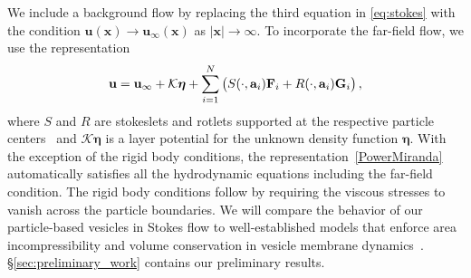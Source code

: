 We include a background flow by replacing the third equation in
\eqref{eq:stokes} with the condition $\mathbf{u}(\mathbf{x})
\to \mathbf{u}_{\infty}(\mathbf{x})$ as $|\mathbf{x}| \to
\infty$. To incorporate the far-field flow, we use the representation 
\begin{align}
\label{PowerMiranda}
  {\bf u} = {\bf u}_{\infty} + \mathcal{K}\boldsymbol{\eta} + 
    \sum_{i=1}^N \left(S(\cdot, {\bf a}_i) {\bf F}_i + 
                 R(\cdot, {\bf a}_i) {\bf G}_i\right),
\end{align}
where $S$ and $R$ are stokeslets and rotlets supported at the respective
particle centers~\cite{leal_2007} and $\mathcal{K}\boldsymbol{\eta}$ is a layer
potential for the unknown density function $\boldsymbol{\eta}$. With the
exception of the rigid body conditions, the
representation~\eqref{PowerMiranda} automatically satisfies all the
hydrodynamic equations including the far-field condition. The rigid
body conditions follow by requiring the viscous stresses to vanish across
the particle boundaries.
%
We will compare the behavior of our particle-based vesicles in Stokes
flow to well-established models that enforce area incompressibility and
volume conservation in vesicle membrane
dynamics~\cite{torres-sanchez_millan_arroyo_2019,mahapatra_saintillan_rangamani_2020, Steigmann99, C6SM02452A}.
\S \ref{sec:preliminary_work} contains our preliminary results.
%
%
%
